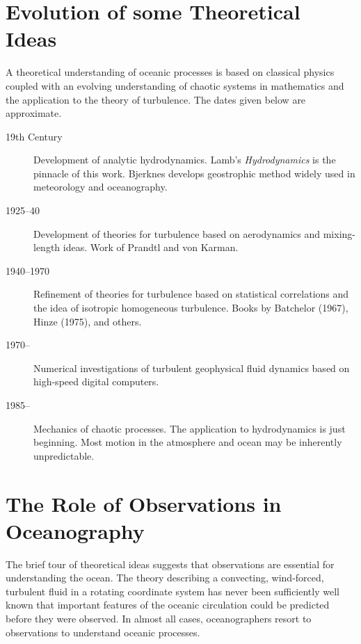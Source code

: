 \section{Evolution of some Theoretical Ideas}
A theoretical understanding of oceanic processes is based on classical
physics coupled with an evolving understanding of chaotic systems in
mathematics and the application to the theory of
turbulence. The dates given below are
approximate.
\vspace{-1.0ex}
\begin{description}
\item[19th Century] Development of analytic hydrodynamics. Lamb's
  \textit{Hydrodynamics} is the pinnacle of this work. Bjerknes
  develops geostrophic method widely used
  in meteorology and oceanography.
\vspace{-1.0ex}
\item[1925--40] Development of theories for turbulence based on
  aerodynamics and mixing-length
  ideas. Work of Prandtl and von Karman.
\vspace{-1.0ex}
\item[1940--1970] Refinement of theories for
  turbulence based on statistical
  correlations and the idea of isotropic homogeneous turbulence. Books
  by Batchelor (1967), Hinze (1975), and others.
\vspace{-1.0ex}
\item[1970--] Numerical investigations of turbulent geophysical fluid
  dynamics based on high-speed digital computers.
\vspace{-1.0ex}
\item[1985--] Mechanics of chaotic processes. The application to
  hydrodynamics is just beginning. Most motion in the atmosphere and
  ocean may be inherently unpredictable.
\end{description}

\section{The Role of Observations in Oceanography}
The brief tour of theoretical ideas suggests that
observations are essential for understanding the ocean. The theory
describing a convecting, wind-forced, tur\-bulent fluid in a rotating
coordinate system has never been sufficiently well known that
important features of the oceanic circulation could be predicted
before they were observed. In almost all cases, oceanographers resort
to observations to understand oceanic processes.

